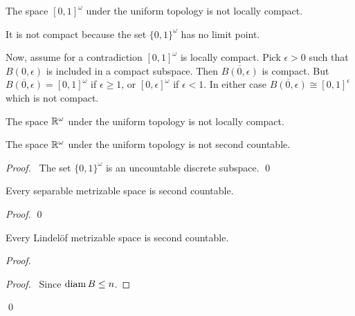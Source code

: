 \begin{example}
    The space $[0,1]^\omega$ under the uniform topology is not locally compact.

    It is not compact because the set $\{ 0,1 \}^\omega$ has no limit point.

    Now, assume for a contradiction $[0,1]^\omega$ is locally compact. Pick $\epsilon > 0$
    such that $B(0,\epsilon)$ is included in a compact subspace. Then $\overline{B(0,\epsilon)}$ is compact.
    But $\overline{B(0,\epsilon)} = [0,1]^\omega$ if $\epsilon \geq 1$, or $[0,\epsilon]^\omega$
    if $\epsilon < 1$. In either case $\overline{B(0,\epsilon)} \cong [0,1]^\epsilon$ which is not
    compact.
\end{example}

\begin{corollary}
    The space $\mathbb{R}^\omega$ under the uniform topology is not locally compact.
\end{corollary}

\begin{example}
    The space $\mathbb{R}^\omega$ under the uniform topology is not second countable.

    \begin{proof}
        \pf\ The set $\{0,1\}^\omega$ is an uncountable discrete subspace. \qed
    \end{proof}
\end{example}

\begin{proposition}
    Every separable metrizable space is second countable.
\end{proposition}

\begin{proof}
    \pf
    \qed
\end{proof}

\begin{proposition}[AC]
    Every Lindel\"{o}f metrizable space is second countable.
\end{proposition}

\begin{proof}
    \pf
    \begin{proof}
        \pf\ Since $\operatorname{diam} B \leq n$.
    \end{proof}
    \qed
\end{proof}

